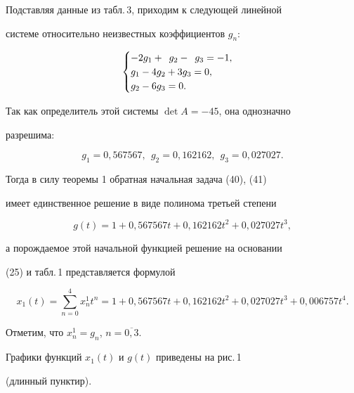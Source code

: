\begin{exam}
Подставляя данные из табл.\,3, приходим к следующей линейной


системе относительно неизвестных коэффициентов $g_n$:


$$


\begin{cases}


-2g_1+\enskip g_2-\enskip g_3=-1, \\


g_1-4g_2+3g_3= 0, \\


g_2-6g_3= 0.


\end{cases}


$$


Так как определитель этой системы $\det A=-45$, она однозначно


разрешима:


$$


g_1=0{,}567567,\ \ g_2=0{,}162162,\ \ g_3=0{,}027027.


$$


Тогда в силу теоремы 1 обратная начальная задача (40), (41)


имеет единственное решение в виде полинома третьей степени


\begin{equation}


g(t)=1+0{,}567567t+0{,}162162t^2+0{,}027027t^3,


\end{equation}


а порождаемое этой начальной функцией решение на основании


(25) и табл.\,1 представляется формулой


\begin{equation}


x_1(t)=\sum_{n=0}^{4}x_n^1t^n=


1+0{,}567567t+0{,}162162t^2+0{,}027027t^3+0{,}006757t^4.


\end{equation}


Отметим, что $x_n^1=g_n$, $n=\overline{0,3}$.





Графики функций $x_1(t)$ и $g(t)$ приведены на рис.\,1 


(длинный пунктир).


\end{exam}





